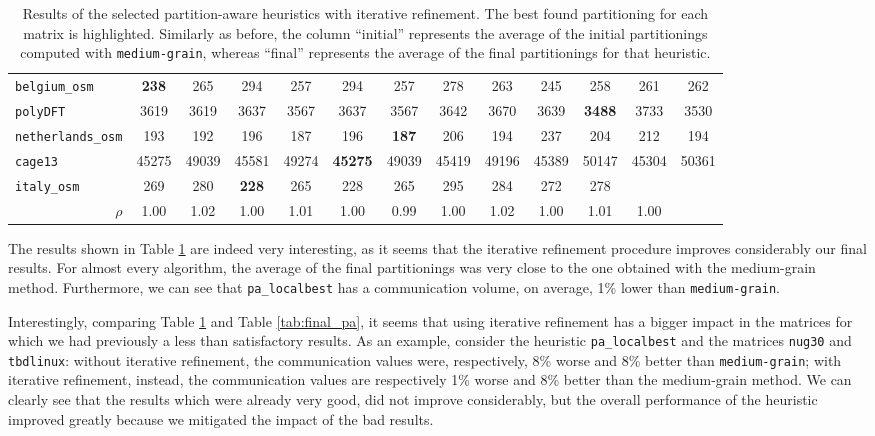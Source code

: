 \begin{table}
\begin{tabular}{|l|c|c||c|c||c|c||c|c||c|c||c|c|}
		\verb|belgium_osm| &  \textbf{238} & 265 & 294 & 257 & 294 & 257 & 278 & 263 & 245 & 258 & 261 & 262 \\
		\verb|polyDFT| &  3619 & 3619 & 3637 & 3567 & 3637 & 3567 & 3642 & 3670 & 3639 & \textbf{3488} & 3733 & 3530 \\
		\verb|netherlands_osm| & 193 & 192 & 196 & 187 & 196 & \textbf{187} & 206 & 194 & 237 & 204 & 212 & 194 \\
		\verb|cage13| &  45275 & 49039 & 45581 & 49274 & \textbf{45275} & 49039 & 45419 & 49196 & 45389 & 50147 & 45304 & 50361 \\
		\verb|italy_osm| &  269 & 280 & \textbf{228} & 265 & 228 & 265 & 295 & 284 & 272 & 278 & & \\ \hline
		\multicolumn{1}{|r|}{$\rho$}	&  1.00 & 1.02 & 1.00 & 1.01 & 1.00 & 0.99 & 1.00 & 1.02 & 1.00 & 1.01 & 1.00 & \\  \hline
	\end{tabular}
	\caption{Results of the selected partition-aware heuristics with iterative refinement. The best found partitioning for each matrix is highlighted. Similarly as before, the column ``initial'' represents the average of the initial partitionings computed with \texttt{medium-grain}, whereas ``final'' represents the average of the final partitionings for that heuristic.} \label{tab:pa_ir}
\end{table}
\pagebreak 

The results shown in Table \ref{tab:pa_ir} are indeed very interesting, as it seems that the iterative refinement procedure improves considerably our final results. For almost every algorithm, the average of the final partitionings was very close to the one obtained with the medium-grain method. Furthermore, we can see that \verb|pa_localbest| has a communication volume, on average, 1\% lower than \verb|medium-grain|.


Interestingly, comparing Table \ref{tab:pa_ir} and Table \ref{tab:final_pa}, it seems that using iterative refinement has a bigger impact in the matrices for which we had previously a less than satisfactory results. As an example, consider the heuristic \verb|pa_localbest| and the matrices \verb|nug30| and \verb|tbdlinux|: without iterative refinement, the communication values were, respectively, 8\% worse and 8\% better than \verb|medium-grain|; with iterative refinement, instead, the communication values are respectively 1\% worse and 8\% better than the medium-grain method. We can clearly see that the results which were already very good, did not improve considerably, but the overall performance of the heuristic improved greatly because we mitigated the impact of the bad results.

